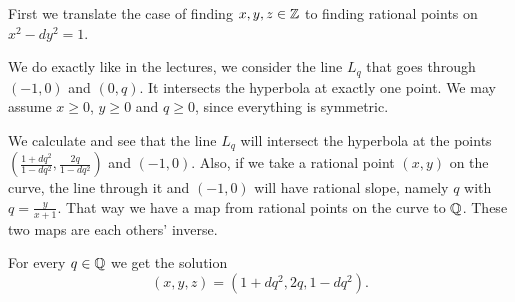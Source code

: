 \newcommand{\sheet}{9}




\maketitle

\begin{exercise}{1}
    First we translate the case of finding $x, y, z \in \mathbb{Z}$ to finding rational
    points on $x^2 - d y^2 = 1$.

    We do exactly like in the lectures, we consider the line $L_q$ that goes
    through $(-1, 0)$ and $(0, q)$. It intersects the hyperbola at exactly one
    point. We may assume $x \geq 0$, $y \geq 0$ and $q \geq 0$, since everything
    is symmetric.

    We calculate and see that the line $L_q$ will intersect the hyperbola at the
    points $\left( \frac{1+dq^2}{1-dq^2}, \frac{2q}{1-dq^2} \right)$ and $(-1,
    0)$. Also, if we take a rational point $(x, y)$ on the curve, the line
    through it and $(-1, 0)$ will have rational slope, namely $q$ with $q =
    \frac{y}{x+1}$. That way we have a map from rational points on the curve to
    $\mathbb{Q}$. These two maps are each others' inverse.

    For every $q \in \mathbb{Q}$ we get the solution
    \begin{equation*}
        (x, y, z) = (1 + dq^2, 2q, 1 - dq^2).
    \end{equation*}
\end{exercise}

